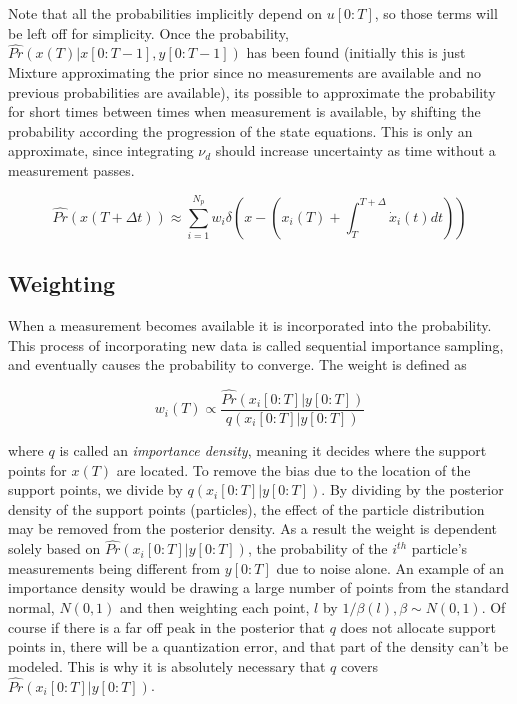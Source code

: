 Note that all the probabilities implicitly depend on $u[0:T]$, so those terms 
will be left off for simplicity.
Once the probability, $\hat{Pr}(x(T) | x[0:T-1], y[0:T-1])$ has been found
(initially this is just Mixture approximating the prior since no measurements are 
available and no previous probabilities are available), its possible to approximate
the probability for short times between times when measurement is available, by shifting
the probability according the progression of the state equations. This is only 
an approximate, since integrating $\nu_d$ should increase uncertainty as
time without a measurement passes. 

\begin{equation}
\hat{Pr}(x(T+\Delta t)) \approx 
\sum_{i=1}^{N_p} w_i\delta\left(x - (x_i(T) + \int_T^{T+\Delta} \dot{x}_i(t) dt) \right)
\end{equation}

\subsection{Weighting}
When a measurement becomes available it is incorporated into the probability.
This process of incorporating new data is called sequential importance sampling,
and eventually causes the probability to converge. The weight is defined
as

\begin{equation}
w_i(T) \propto \frac{\hat{Pr}(x_i[0:T] | y[0:T])}{q(x_i[0:T] | y[0:T])}
\label{eq:weightfunc}
\end{equation}

where $q$ is called an \emph{importance density}, meaning it decides where
the support points for $x(T)$ are located. To remove the bias due to the
location of the support points, we divide by $q(x_i[0:T] | y[0:T])$. By dividing by 
the posterior density of the support points (particles), the effect of the particle 
distribution may be removed from the posterior density. As a result the weight
is dependent solely based
on $\hat{Pr}(x_i[0:T] | y[0:T])$, the probability of the $i^{th}$ particle's measurements
being different from $y[0:T]$ due to noise alone.
An example of an importance density would be drawing a large
number of points from the standard normal, $N(0,1)$ and then weighting each point, $l$ by 
$1/\beta(l), \beta \sim N(0,1)$. Of course if there is a far off peak in
the posterior that $q$ does not allocate support points in, there will 
be a quantization error, and that part of the density can't be modeled. This is why
it is absolutely necessary that $q$ covers $\hat{Pr}(x_i[0:T] | y[0:T])$.

